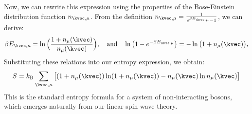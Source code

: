 Now, we can rewrite this expression using the properties of the Bose-Einstein distribution function $n_{\kvec, \mu}$. From the definition $n_{\kvec, \mu} = \frac{1}{e^{\beta E_{\kvec, \mu}} - 1}$, we can derive:
\begin{equation}
    \beta E_{\kvec, \mu} = \ln \Big( \frac{1 + n_{\mu}(\kvec)}{n_{\mu}(\kvec)} \Big), 
    \quad \text{and} \quad
    \ln \left( 1 - e^{-\beta E_{\kvec, \mu}} \right) 
    = -\ln \big( 1 + n_{\mu} (\kvec) \big), 
\end{equation}
Substituting these relations into our entropy expression, we obtain:
\begin{equation}
    S = k_{\rm B} \sum_{\kvec, \mu} \big[ (1 + n_{\mu}(\kvec)) \ln (1 + n_{\mu}(\kvec)) - n_{\mu}(\kvec) \ln n_{\mu} (\kvec) \big]
\end{equation}
This is the standard entropy formula for a system of non-interacting bosons, which emerges naturally from our linear spin wave theory.




